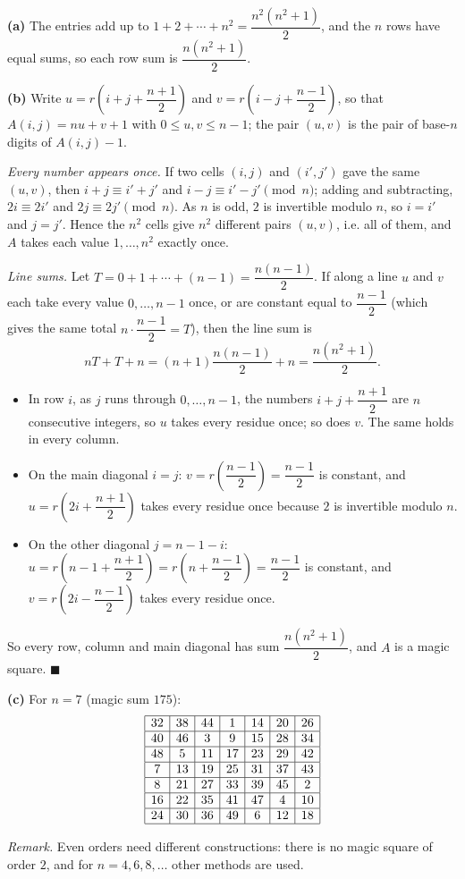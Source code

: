 \textbf{(a)} The entries add up to $1+2+\cdots+n^2=\dfrac{n^2\left(n^2+1\right)}{2}$, and the $n$ rows have equal sums, so each row sum is $\dfrac{n\left(n^2+1\right)}{2}$.

\textbf{(b)} Write $u=r\!\left(i+j+\dfrac{n+1}{2}\right)$ and $v=r\!\left(i-j+\dfrac{n-1}{2}\right)$, so that $A(i,j)=nu+v+1$ with $0\le u,v\le n-1$; the pair $(u,v)$ is the pair of base-$n$ digits of $A(i,j)-1$.

\emph{Every number appears once.} If two cells $(i,j)$ and $(i',j')$ gave the same $(u,v)$, then $i+j\equiv i'+j'$ and $i-j\equiv i'-j'\pmod n$; adding and subtracting, $2i\equiv2i'$ and $2j\equiv2j'\pmod n$. As $n$ is odd, $2$ is invertible modulo $n$, so $i=i'$ and $j=j'$. Hence the $n^2$ cells give $n^2$ different pairs $(u,v)$, i.e. all of them, and $A$ takes each value $1,\dots,n^2$ exactly once.

\emph{Line sums.} Let $T=0+1+\cdots+(n-1)=\dfrac{n(n-1)}{2}$. If along a line $u$ and $v$ each take every value $0,\dots,n-1$ once, or are constant equal to $\dfrac{n-1}{2}$ (which gives the same total $n\cdot\dfrac{n-1}{2}=T$), then the line sum is
\[nT+T+n=(n+1)\dfrac{n(n-1)}{2}+n=\dfrac{n\left(n^2+1\right)}{2} .\]
\begin{itemize}
\item In row $i$, as $j$ runs through $0,\dots,n-1$, the numbers $i+j+\dfrac{n+1}{2}$ are $n$ consecutive integers, so $u$ takes every residue once; so does $v$. The same holds in every column.
\item On the main diagonal $i=j$: $v=r\!\left(\dfrac{n-1}{2}\right)=\dfrac{n-1}{2}$ is constant, and $u=r\!\left(2i+\dfrac{n+1}{2}\right)$ takes every residue once because $2$ is invertible modulo $n$.
\item On the other diagonal $j=n-1-i$: $u=r\!\left(n-1+\dfrac{n+1}{2}\right)=r\!\left(n+\dfrac{n-1}{2}\right)=\dfrac{n-1}{2}$ is constant, and $v=r\!\left(2i-\dfrac{n-1}{2}\right)$ takes every residue once.
\end{itemize}
So every row, column and main diagonal has sum $\dfrac{n\left(n^2+1\right)}{2}$, and $A$ is a magic square. $\blacksquare$

\textbf{(c)} For $n=7$ (magic sum $175$):
\[\begin{array}{|c|c|c|c|c|c|c|}\hline
32&38&44&1&14&20&26\\\hline
40&46&3&9&15&28&34\\\hline
48&5&11&17&23&29&42\\\hline
7&13&19&25&31&37&43\\\hline
8&21&27&33&39&45&2\\\hline
16&22&35&41&47&4&10\\\hline
24&30&36&49&6&12&18\\\hline
\end{array}\]

\emph{Remark.} Even orders need different constructions: there is no magic square of order $2$, and for $n=4,6,8,\dots$ other methods are used.
